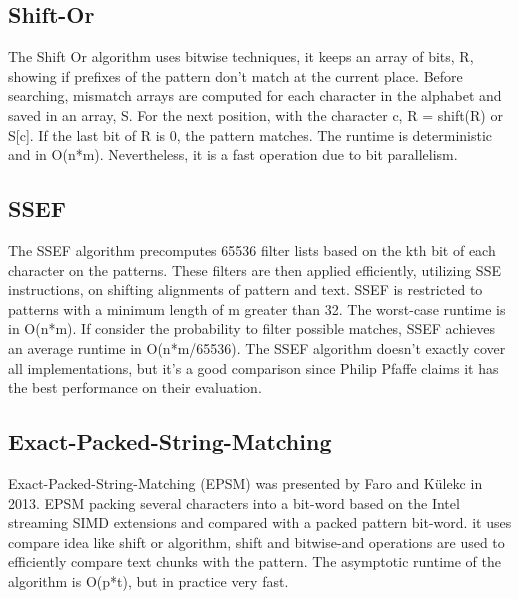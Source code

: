 \documentclass[11pt]{article}       %
\newcommand{\includeFig}[3]      {\begin{figure}[htb] \begin{center}
                                 \includegraphics
                                 [width=4in,keepaspectratio] %
                                 {#2}\caption{\label{#1}#3} \end{center} \end{figure}}
\begin{document}
\subsection{Shift-Or}\label{so}
The Shift Or algorithm uses bitwise techniques\cite{Matching}, it keeps an array of bits, R, showing if prefixes of the pattern don't match at the current place. Before searching, mismatch arrays are computed for each character in the alphabet and saved in an array, S. For the next position, with the character c, R = shift(R) or S[c]. If the last bit of R is 0, the pattern matches. The runtime is deterministic and in O(n*m). Nevertheless, it is a fast operation due to bit parallelism.

\subsection{SSEF}\label{SSEF}
The SSEF algorithm precomputes 65536 filter lists based on the kth bit of each character on the patterns\cite{Matching}. These filters are then applied efficiently, utilizing SSE instructions, on shifting alignments of pattern and text. SSEF is restricted to patterns with a minimum length of m greater than 32. The worst-case runtime is in O(n*m). If consider the probability to filter possible matches, SSEF achieves an average runtime in O(n*m/65536). The SSEF algorithm doesn't exactly cover all implementations, but it's a good comparison since Philip Pfaffe claims it has the best performance on their evaluation\cite{SSEF}.

\subsection{Exact-Packed-String-Matching}\label{EPSM}
Exact-Packed-String-Matching (EPSM) was presented by Faro and Külekc in 2013\cite{EPSM}. EPSM packing several characters into a bit-word based on the Intel streaming SIMD extensions and compared with a packed pattern bit-word. it uses compare idea like shift or algorithm, shift and bitwise-and operations are used to efficiently compare text chunks with the pattern. The asymptotic runtime of the algorithm is O(p*t), but in practice very fast.



\end{document}
